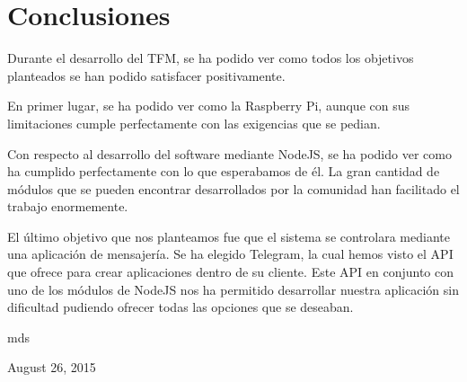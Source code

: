 \documentclass[10pt,journal,compsoc]{IEEEtran}
\begin{document}
\section{Conclusiones}
Durante el desarrollo del TFM, se ha podido ver como todos los objetivos 
planteados se han podido satisfacer positivamente.

En primer lugar, se ha podido ver como la Raspberry Pi, aunque con sus 
limitaciones cumple perfectamente con las exigencias que se pedian.

Con respecto al desarrollo del software mediante NodeJS, se ha podido ver como 
ha cumplido perfectamente con lo que esperabamos de él. La gran cantidad de 
módulos que se pueden encontrar desarrollados por la comunidad han facilitado el 
trabajo enormemente.

El último objetivo que nos planteamos fue que el sistema se controlara mediante 
una aplicación de mensajería. Se ha elegido Telegram, la cual hemos visto el API 
que ofrece para crear aplicaciones dentro de su cliente. Este API en conjunto 
con uno de los módulos de NodeJS nos ha permitido desarrollar nuestra aplicación 
sin dificultad pudiendo ofrecer todas las opciones que se deseaban.

\hfill mds
 
\hfill August 26, 2015

\end{document}
